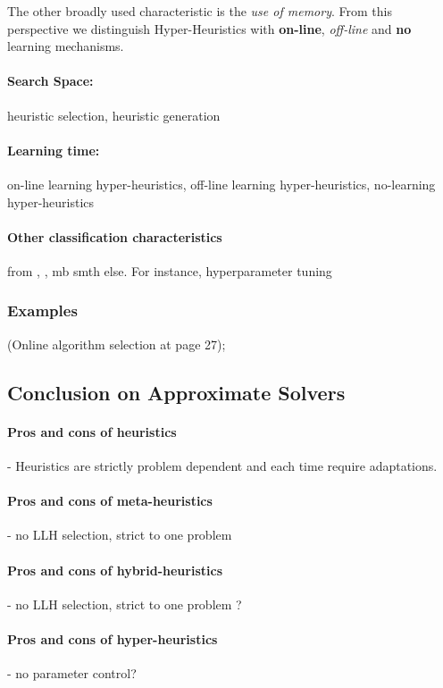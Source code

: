 The other broadly used characteristic is the \textit{use of memory}. From this perspective we distinguish Hyper-Heuristics with \textbf{on-line}, \textit{off-line} and \textbf{no} learning mechanisms. 


\paragraph{Search Space:} heuristic selection, heuristic generation
\paragraph{Learning time:} on-line learning hyper-heuristics, off-line learning hyper-heuristics, no-learning hyper-heuristics
\paragraph{Other classification characteristics} from \cite{kerschke2019automated}, \cite{burke2019classification}, mb smth else. For instance, hyperparameter tuning
\subsubsection{Examples}\label{bg: hh examples}%
\cite{drake2019recent} (Online algorithm selection at page 27); \cite{kerschke2019automated}

\subsection{Conclusion on Approximate Solvers}
\paragraph{Pros and cons of heuristics} - Heuristics are strictly problem dependent and each time require adaptations.
\paragraph{Pros and cons of meta-heuristics} - no LLH selection, strict to one problem
\paragraph{Pros and cons of hybrid-heuristics} - no LLH selection, strict to one problem ? 
\paragraph{Pros and cons of hyper-heuristics} - no parameter control?



